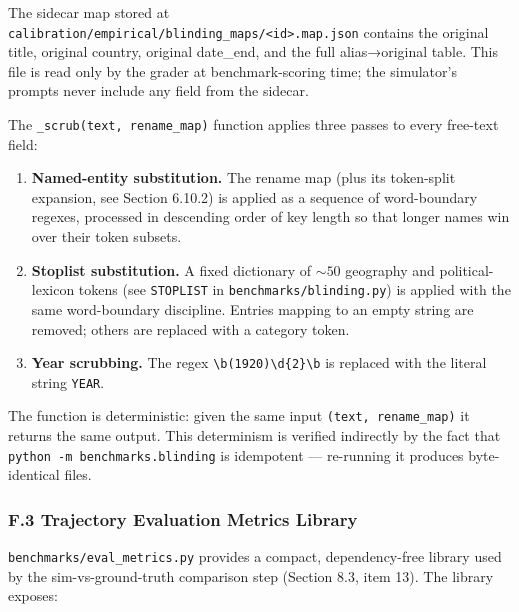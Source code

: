 \documentclass[
]{article}
\providecommand{\tightlist}{%
  \setlength{\itemsep}{0pt}\setlength{\parskip}{0pt}}
\begin{document}
The sidecar map stored at
\texttt{calibration/empirical/blinding\_maps/\textless{}id\textgreater{}.map.json}
contains the original title, original country, original date\_end, and
the full alias→original table. This file is read only by the grader at
benchmark-scoring time; the simulator's prompts never include any field
from the sidecar.

The \texttt{\_scrub(text,\ rename\_map)} function applies three passes
to every free-text field:

\begin{enumerate}
\def\labelenumi{\arabic{enumi}.}
\tightlist
\item
  \textbf{Named-entity substitution.} The rename map (plus its
  token-split expansion, see Section 6.10.2) is applied as a sequence of
  word-boundary regexes, processed in descending order of key length so
  that longer names win over their token subsets.
\item
  \textbf{Stoplist substitution.} A fixed dictionary of \(\sim 50\)
  geography and political-lexicon tokens (see \texttt{STOPLIST} in
  \texttt{benchmarks/blinding.py}) is applied with the same
  word-boundary discipline. Entries mapping to an empty string are
  removed; others are replaced with a category token.
\item
  \textbf{Year scrubbing.} The regex
  \texttt{\textbackslash{}b(19\textbar{}20)\textbackslash{}d\{2\}\textbackslash{}b}
  is replaced with the literal string \texttt{YEAR}.
\end{enumerate}

The function is deterministic: given the same input
\texttt{(text,\ rename\_map)} it returns the same output. This
determinism is verified indirectly by the fact that
\texttt{python\ -m\ benchmarks.blinding} is idempotent --- re-running it
produces byte-identical files.

\subsubsection{F.3 Trajectory Evaluation Metrics
Library}\label{f.3-trajectory-evaluation-metrics-library}

\texttt{benchmarks/eval\_metrics.py} provides a compact, dependency-free
library used by the sim-vs-ground-truth comparison step (Section 8.3,
item 13). The library exposes:
\end{document}
